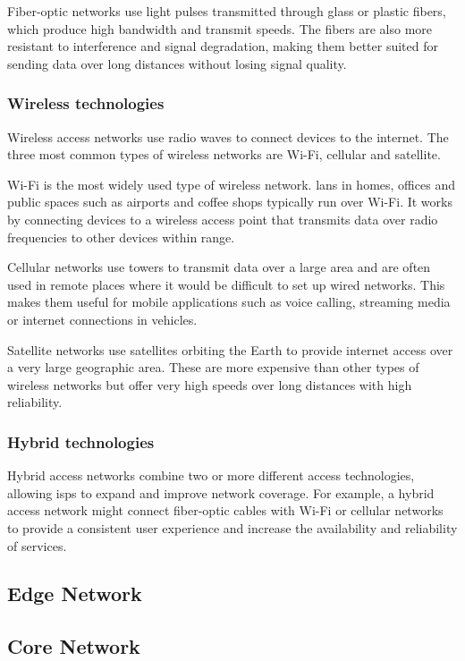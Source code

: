 Fiber-optic networks use light pulses transmitted through glass or plastic fibers, which produce high bandwidth and transmit speeds. 
The fibers are also more resistant to interference and signal degradation, making them better suited for sending data over long distances without losing signal quality.

\subsubsection{Wireless technologies}

Wireless access networks use radio waves to connect devices to the internet. The three most common types of wireless networks are Wi-Fi, cellular and satellite.

Wi-Fi is the most widely used type of wireless network. \acp{lan} in homes, offices and public spaces such as airports and coffee shops typically run over Wi-Fi. It works by connecting devices to a wireless access point that transmits data over radio frequencies to other devices within range.

Cellular networks use towers to transmit data over a large area and are often used in remote places where it would be difficult to set up wired networks. This makes them useful for mobile applications such as voice calling, streaming media or internet connections in vehicles.

Satellite networks use satellites orbiting the Earth to provide internet access over a very large geographic area. These are more expensive than other types of wireless networks but offer very high speeds over long distances with high reliability.


\subsubsection{Hybrid technologies}

Hybrid access networks combine two or more different access technologies, allowing \acp{isp} to expand and improve network coverage. For example, a hybrid access network might connect fiber-optic cables with Wi-Fi or cellular networks to provide a consistent user experience and increase the availability and reliability of services.

\subsection{Edge Network}

\subsection{Core Network}

